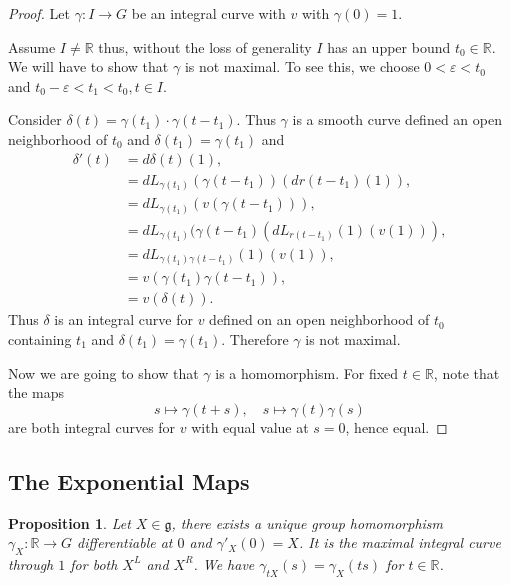 \documentclass{article}
\newtheorem{proposition}{Proposition}[section]
\numberwithin{equation}{section}
\begin{document}
\begin{proof}
Let $\gamma:I\to G$ be an integral curve with $v$ with $\gamma(0)=1$.\\
\par Assume $I\not=\mathbb{R}$ thus, without the loss of generality $I$ has an upper bound $t_0\in\mathbb{R}$. We will have to show that $\gamma$ is not maximal. To see this, we choose $0<\varepsilon<t_0$ and $t_0-\varepsilon<t_1<t_0, t\in I$.\\
\par Consider $\delta(t) = \gamma(t_1)\cdot\gamma(t-t_1)$. Thus $\gamma$ is a smooth curve defined an open neighborhood of $t_0$ and $\delta(t_1)=\gamma(t_1)$ and 
\begin{align*}
\delta'(t) &= d\delta(t)(1),\\
& = dL_{\gamma(t_1)}(\gamma(t-t_1))(dr(t-t_1)(1)),\\
& = dL_{\gamma(t_1)}(v(\gamma(t-t_1))),\\
& = dL_{\gamma(t_1)}(\gamma(t-t_1)(dL_{r(t-t_1)}(1)(v(1))),\\
& = dL_{\gamma(t_1)\gamma(t-t_1)}(1)(v(1)),\\
& = v(\gamma(t_1)\gamma(t-t_1)),\\
&= v(\delta(t)).
\end{align*}
Thus $\delta$ is an integral curve for $v$ defined on an open neighborhood of $t_0$ containing $t_1$ and $\delta(t_1) = \gamma(t_1)$. Therefore $\gamma$ is not maximal.\\
\par Now we are going to show that $\gamma$ is a homomorphism. For fixed $t\in \mathbb{R}$, note that the maps 
\begin{equation*}
s\mapsto\gamma(t+s),\quad s\mapsto\gamma(t)\gamma(s)
\end{equation*}
are both integral curves for $v$ with equal value at $s=0$, hence equal. 
\end{proof}

\subsection{The Exponential Maps}

\begin{proposition}
Let $X\in\mathfrak{g}$, there exists a unique group homomorphism $\gamma_X:\mathbb{R}\to G$ differentiable at $0$ and $\gamma'_X(0)=X$. It is the maximal integral curve through $1$ for both $X^L$ and $X^R$. We have $\gamma_{tX}(s)=\gamma_X(ts)$ for $t\in \mathbb{R}$. 
\end{proposition}
\end{document}

